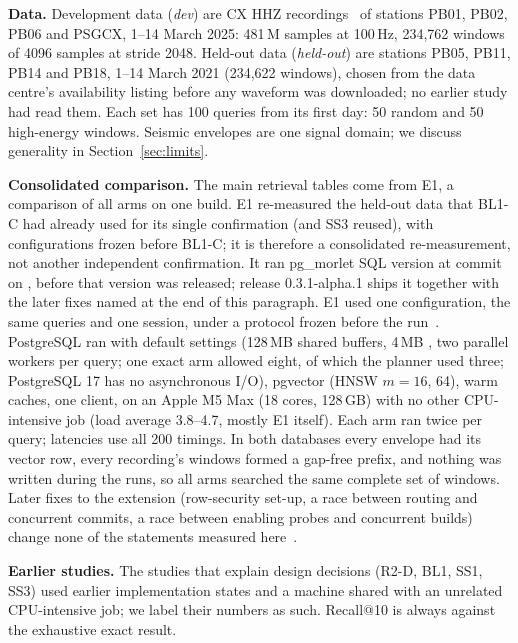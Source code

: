 \documentclass[sigconf]{acmart}
\begin{document}
\textbf{Data.} Development data (\emph{dev}) are CX HHZ recordings~\cite{ipoc} of stations PB01, PB02, PB06 and PSGCX, 1--14 March 2025: 481\,M samples at 100\,Hz, 234,762 windows of 4096 samples at stride 2048. Held-out data (\emph{held-out}) are stations PB05, PB11, PB14 and PB18, 1--14 March 2021 (234,622 windows), chosen from the data centre's availability listing before any waveform was downloaded; no earlier study had read them. Each set has 100 queries from its first day: 50 random and 50 high-energy windows. Seismic envelopes are one signal domain; we discuss generality in Section~\ref{sec:limits}.

\textbf{Consolidated comparison.} The main retrieval tables come from E1, a comparison of all arms on one build. E1 re-measured the held-out data that BL1-C had already used for its single confirmation (and SS3 reused), with configurations frozen before BL1-C; it is therefore a consolidated re-measurement, not another independent confirmation. It ran pg\_morlet SQL version \MeasuredSQLVersion{} at commit \MeasuredCommit{} on , before that version was released; release 0.3.1-alpha.1 ships it together with the later fixes named at the end of this paragraph. E1 used one configuration, the same queries and one session, under a protocol frozen before the run~\cite{e1}. PostgreSQL \MeasuredPostgres{} ran with default settings (128\,MB shared buffers, 4\,MB , two parallel workers per query; one exact arm allowed eight, of which the planner used three; PostgreSQL 17 has no asynchronous I/O), pgvector \MeasuredPgvector{} (HNSW $m{=}16$,  64), warm caches, one client, on an Apple M5 Max (18 cores, 128\,GB) with no other CPU-intensive job (load average 3.8--4.7, mostly E1 itself). Each arm ran twice per query; latencies use all 200 timings. In both databases every envelope had its vector row, every recording's windows formed a gap-free prefix, and nothing was written during the runs, so all arms searched the same complete set of windows. Later fixes to the extension (row-security set-up, a race between routing and concurrent commits, a race between enabling probes and concurrent builds) change none of the statements measured here~\cite{e1}.

\textbf{Earlier studies.} The studies that explain design decisions (R2-D, BL1, SS1, SS3) used earlier implementation states and a machine shared with an unrelated CPU-intensive job; we label their numbers as such. Recall@10 is always against the exhaustive exact result.
\end{document}
